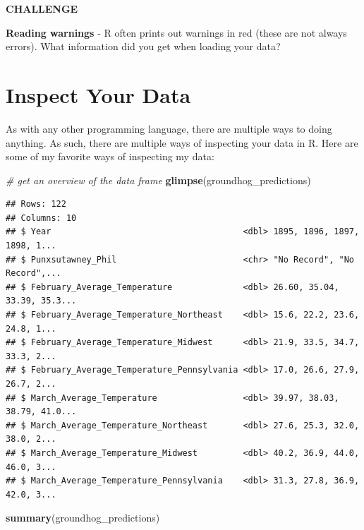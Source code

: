 \documentclass[
]{book}
\newenvironment{Shaded}{\begin{snugshade}}{\end{snugshade}}
\newcommand{\CommentTok}[1]{\textcolor[rgb]{0.56,0.35,0.01}{\textit{#1}}}
\newcommand{\KeywordTok}[1]{\textcolor[rgb]{0.13,0.29,0.53}{\textbf{#1}}}
\newcommand{\NormalTok}[1]{#1}
\begin{document}
\textbf{CHALLENGE}

\textbf{Reading warnings} - R often prints out warnings in red (these are not always errors). What information did you get when loading your data?

\hypertarget{inspect-your-data}{%
\section{Inspect Your Data}\label{inspect-your-data}}

As with any other programming language, there are multiple ways to doing anything. As such, there are multiple ways of inspecting your data in R. Here are some of my favorite ways of inspecting my data:

\begin{Shaded}
\begin{Highlighting}[]
\CommentTok{# get an overview of the data frame}
\KeywordTok{glimpse}\NormalTok{(groundhog_predictions)}
\end{Highlighting}
\end{Shaded}

\begin{verbatim}
## Rows: 122
## Columns: 10
## $ Year                                      <dbl> 1895, 1896, 1897, 1898, 1...
## $ Punxsutawney_Phil                         <chr> "No Record", "No Record",...
## $ February_Average_Temperature              <dbl> 26.60, 35.04, 33.39, 35.3...
## $ February_Average_Temperature_Northeast    <dbl> 15.6, 22.2, 23.6, 24.8, 1...
## $ February_Average_Temperature_Midwest      <dbl> 21.9, 33.5, 34.7, 33.3, 2...
## $ February_Average_Temperature_Pennsylvania <dbl> 17.0, 26.6, 27.9, 26.7, 2...
## $ March_Average_Temperature                 <dbl> 39.97, 38.03, 38.79, 41.0...
## $ March_Average_Temperature_Northeast       <dbl> 27.6, 25.3, 32.0, 38.0, 2...
## $ March_Average_Temperature_Midwest         <dbl> 40.2, 36.9, 44.0, 46.0, 3...
## $ March_Average_Temperature_Pennsylvania    <dbl> 31.3, 27.8, 36.9, 42.0, 3...
\end{verbatim}

\begin{Shaded}
\begin{Highlighting}[]
\KeywordTok{summary}\NormalTok{(groundhog_predictions)}
\end{Highlighting}
\end{Shaded}
\end{document}
